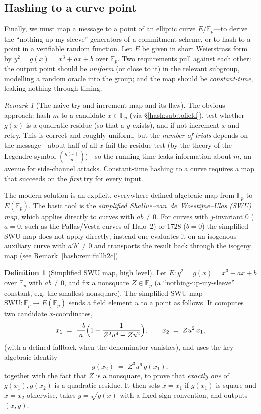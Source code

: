 \documentclass[11pt,a4paper]{article}
\theoremstyle{definition}
\newtheorem{definition}[theorem]{Definition}
\theoremstyle{remark}
\newtheorem{remark}[theorem]{Remark}
\newcommand{\Fp}{\ensuremath{\mathbb{F}_{p}}}
\newcommand{\legendre}[2]{\left(\frac{#1}{#2}\right)}
\begin{document}
\subsection{Hashing to a curve point}\label{hash:sub:tocurve}

Finally, we must map a message to a point of an elliptic curve \(E/\Fp\)---to derive the ``nothing-up-my-sleeve'' generators of a commitment scheme, or to hash to a point in a verifiable random function. Let \(E\) be given in short Weierstrass form by \(y^{2} = g(x) = x^{3} + ax + b\) over \(\Fp\). Two requirements pull against each other: the output point should be \emph{uniform} (or close to it) in the relevant subgroup, modelling a random oracle into the group; and the map should be \emph{constant-time}, leaking nothing through timing.

\begin{remark}[The naive try-and-increment map and its flaw]\label{hash:rem:tryincrement}
The obvious approach: hash \(m\) to a candidate \(x \in \Fp\) (via \S\ref{hash:sub:tofield}), test whether \(g(x)\) is a quadratic residue (so that a \(y\) exists), and if not increment \(x\) and retry. This is correct and roughly uniform, but the \emph{number of trials} depends on the message---about half of all \(x\) fail the residue test (by the theory of the Legendre symbol \(\legendre{g(x)}{p}\))---so the running time leaks information about \(m\), an avenue for side-channel attacks. Constant-time hashing to a curve requires a map that succeeds on the \emph{first} try for every input.
\end{remark}

The modern solution is an explicit, everywhere-defined algebraic map from \(\Fp\) to \(E(\Fp)\). The basic tool is the \emph{simplified Shallue--van~de~Woestijne--Ulas (SWU) map}, which applies directly to curves with \(ab \neq 0\). For curves with \(j\)-invariant \(0\) (\(a = 0\), such as the Pallas/Vesta curves of Halo~2) or \(1728\) (\(b = 0\)) the simplified SWU map does not apply directly; instead one evaluates it on an isogenous auxiliary curve with \(a'b' \neq 0\) and transports the result back through the isogeny map (see Remark~\ref{hash:rem:fullh2c}).

\begin{definition}[Simplified SWU map, high level]\label{hash:def:swu}
Let \(E \colon y^{2} = g(x) = x^{3} + ax + b\) over \(\Fp\) with \(ab \neq 0\), and fix a nonsquare \(Z \in \Fp\) (a ``nothing-up-my-sleeve'' constant, e.g. the smallest nonsquare). The simplified SWU map \(\mathrm{SWU} \colon \Fp \to E(\Fp)\) sends a field element \(u\) to a point as follows. It computes two candidate \(x\)-coordinates,
\[
  x_{1} \;=\; \frac{-b}{a}\Bigl(1 + \frac{1}{Z^{2}u^{4} + Z u^{2}}\Bigr),
  \qquad
  x_{2} \;=\; Z u^{2}\, x_{1},
\]
(with a defined fallback when the denominator vanishes), and uses the key algebraic identity
\[
  g(x_{2}) \;=\; Z^{3} u^{6}\, g(x_{1}),
\]
together with the fact that \(Z\) is a nonsquare, to prove that \emph{exactly one} of \(g(x_{1}), g(x_{2})\) is a quadratic residue. It then sets \(x = x_{1}\) if \(g(x_{1})\) is square and \(x = x_{2}\) otherwise, takes \(y = \sqrt{g(x)}\) with a fixed sign convention, and outputs \((x,y)\).
\end{definition}
\end{document}
